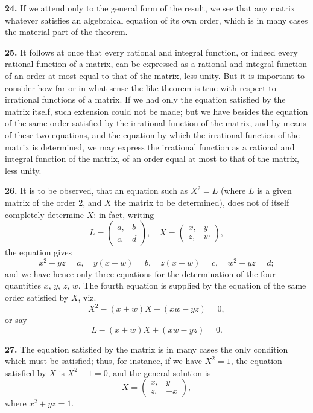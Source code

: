 \documentclass[11pt,a4paper]{book}
\begin{document}
\begin{center}
\medskip
\noindent\textbf{24.} If we attend only to the general form of the result, we see that any matrix whatever satisfies an algebraical equation of its own order, which is in many cases the material part of the theorem.

\medskip
\noindent\textbf{25.} It follows at once that every rational and integral function, or indeed every rational function of a matrix, can be expressed as a rational and integral function of an order at most equal to that of the matrix, less unity. But it is important to consider how far or in what sense the like theorem is true with respect to irrational functions of a matrix. If we had only the equation satisfied by the matrix itself, such extension could not be made; but we have besides the equation of the same order satisfied by the irrational function of the matrix, and by means of these two equations, and the equation by which the irrational function of the matrix is determined, we may express the irrational function as a rational and integral function of the matrix, of an order equal at most to that of the matrix, less unity.

\medskip
\noindent\textbf{26.} It is to be observed, that an equation such as $X^2 = L$ (where $L$ is a given matrix of the order 2, and $X$ the matrix to be determined), does not of itself completely determine $X$: in fact, writing
\[
L = \begin{pmatrix} a, & b \\ c, & d \end{pmatrix},\quad
X = \begin{pmatrix} x, & y \\ z, & w \end{pmatrix},
\]
the equation gives
\[x^2+yz = a,\quad y(x+w)=b,\quad z(x+w)=c,\quad w^2+yz=d;\]
and we have hence only three equations for the determination of the four quantities $x$, $y$, $z$, $w$. The fourth equation is supplied by the equation of the same order satisfied by $X$, viz.
\[
X^2 - (x+w)X + (xw-yz) = 0,
\]
or say
\[
L - (x+w)X + (xw-yz) = 0.
\]

\newpage

\medskip
\noindent\textbf{27.} The equation satisfied by the matrix is in many cases the only condition which must be satisfied; thus, for instance, if we have $X^2 = 1$, the equation satisfied by $X$ is $X^2 - 1 = 0$, and the general solution is
\[
X = \begin{pmatrix} x, & y \\ z, & -x \end{pmatrix},
\]
where $x^2 + yz = 1$.


\end{center}
\end{document}
